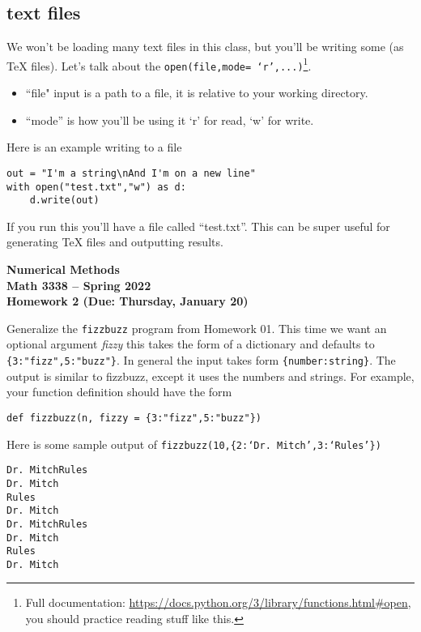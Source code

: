 \documentclass[11pt,letterpaper]{article}
\newcommand{\semester}{Spring 2022}
\newcommand{\due}{Thursday, January 20}
\begin{document}
\subsection{text files}
We won't be loading many text files in this class, but you'll be writing some (as TeX files). Let's talk about the \texttt{open(file,mode= `r',...)}\footnote{Full documentation: \url{https://docs.python.org/3/library/functions.html\#open}, you should practice reading stuff like this.}. 
\begin{itemize}
 \item ``file" input is a path to a file, it is relative to your working directory. 
 \item ``mode'' is how you'll be using it `r' for read, `w' for write. 
\end{itemize}
Here is an example writing to a file
\begin{verbatim}
out = "I'm a string\nAnd I'm on a new line"
with open("test.txt","w") as d:
    d.write(out)
\end{verbatim}
If you run this you'll have a file called ``test.txt''. This can be super useful for generating TeX files and outputting results. 


\newpage

\begin{center}
{\huge{\bf  Numerical Methods}} \\[1.5ex]
{\bf Math 3338 -- \semester}\\[1.5ex]
{\Large{\bf Homework 2 (Due: \due)}}\\
\end{center}
\vspace{2mm}


\begin{problem}
Generalize the \texttt{fizzbuzz} program from Homework 01. This time we want an optional argument
\emph{fizzy} this takes the form of a dictionary and defaults to \texttt{\{3:"fizz",5:"buzz"\}}. 
In general the input takes form \texttt{\{number:string\}}. The output is similar to fizzbuzz, except
it uses the numbers and strings. For example, your function definition should have the form
\begin{verbatim}
def fizzbuzz(n, fizzy = {3:"fizz",5:"buzz"})
\end{verbatim}

Here is some sample output of \texttt{fizzbuzz(10,\{2:`Dr. Mitch',3:`Rules'\})}
\begin{verbatim}
Dr. MitchRules
Dr. Mitch
Rules
Dr. Mitch
Dr. MitchRules
Dr. Mitch
Rules
Dr. Mitch
\end{verbatim}

\end{problem}
\end{document}
